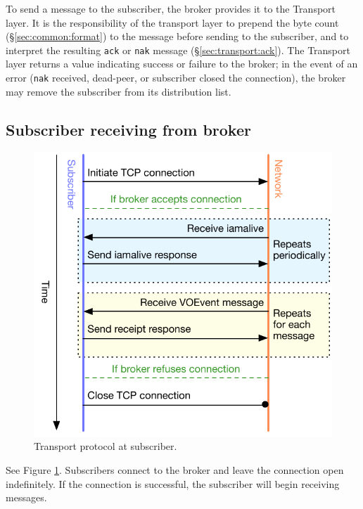 \documentclass[a4paper,11pt]{ivoa}
\begin{document}
To send a message to the subscriber, the broker provides it to the Transport
layer. It is the responsibility of the transport layer to prepend the byte
count (\S\ref{sec:common:format}) to the message before sending to the
subscriber, and to interpret the resulting \texttt{ack} or \texttt{nak}
message (\S\ref{sec:transport:ack}). The Transport layer returns a value
indicating success or failure to the broker; in the event of an error
(\texttt{nak} received, dead-peer, or subscriber closed the connection), the
broker may remove the subscriber from its distribution list.

\subsection{Subscriber receiving from broker}
\label{sec:protocol:subfrombroker}

\begin{figure}[H]
  \begin{center}
  \includegraphics{figures/subfrombroker.pdf}
  \end{center}

  \caption{Transport protocol at subscriber.}

  \label{fig:protocol:subfrombroker}
\end{figure}

See Figure \ref{fig:protocol:subfrombroker}. Subscribers connect to the broker
and leave the connection open indefinitely. If the connection is successful,
the subscriber will begin receiving messages.
\end{document}
